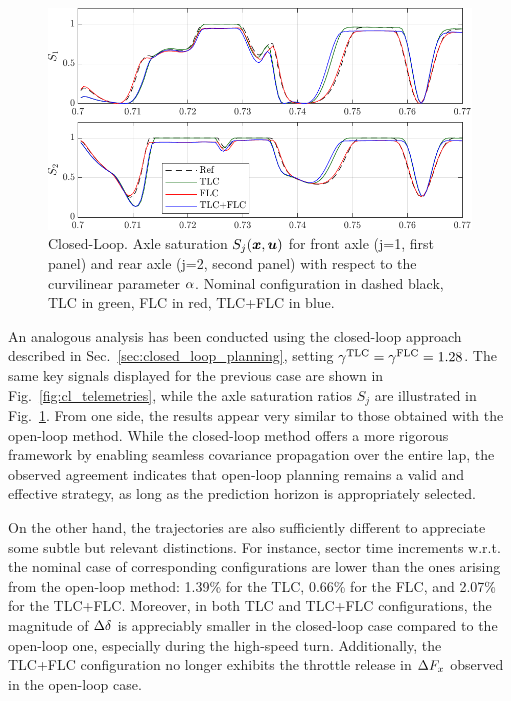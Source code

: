 \begin{figure}[b!]
	\centering
	\includegraphics[scale = 1.005]{Fig/cl_saturation.pdf}
	\caption{Closed-Loop. Axle saturation $S_j(\boldsymbol{x},\boldsymbol{u})$ for front axle (j=1, first panel) and rear axle (j=2, second panel) with respect to the curvilinear parameter $\alpha$. Nominal configuration in dashed black, TLC in green, FLC in red, TLC+FLC in blue.
	}
	\label{fig:cl_saturation}
\end{figure}

An analogous analysis has been conducted using the closed-loop approach described in Sec.~\ref{sec:closed_loop_planning}, setting $\gamma^\textrm{TLC}=\gamma^\textrm{FLC}=1.28$.
The same key signals displayed for the previous case are shown in Fig.~\ref{fig:cl_telemetries}, while the axle saturation ratios $S_j$ are illustrated in Fig.~\ref{fig:cl_saturation}.
From one side, the results appear very similar to those obtained with the open-loop method. While the closed-loop method offers a more rigorous framework by enabling seamless covariance propagation over the entire lap, the observed agreement indicates that open-loop planning remains a valid and effective strategy, as long as the prediction horizon is appropriately selected.

On the other hand, the trajectories are also sufficiently different to appreciate some subtle but relevant distinctions. For instance, sector time increments w.r.t. the nominal case of corresponding configurations are lower than the ones arising from the open-loop method: 1.39\% for the TLC, 0.66\% for the FLC, and 2.07\% for the TLC+FLC.
Moreover, in both TLC and TLC+FLC configurations, the magnitude of $\Delta\delta$ is appreciably smaller in the closed-loop case compared to the open-loop one, especially during the high-speed turn.
Additionally, the TLC+FLC configuration no longer exhibits the throttle release in $\Delta F_x$ observed in the open-loop case.

